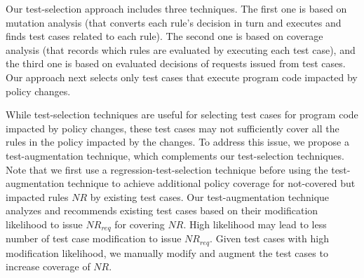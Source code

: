 
Our test-selection approach includes three techniques.
The first one is based on mutation analysis (that converts each rule's decision in turn and executes 
and finds test cases related to each rule). The second one is based on coverage analysis (that records 
which rules are evaluated by executing each test case), and the third one is based on evaluated 
decisions of requests issued from test cases. Our approach next selects only test cases that execute program code impacted by policy changes.

While test-selection techniques are useful for selecting test cases for program code impacted by policy changes, these test cases may not sufficiently cover all the rules in the policy impacted by the changes.
To address this issue, we propose a test-augmentation technique, which complements our test-selection techniques.
Note that we first use a regression-test-selection technique before using the test-augmentation technique to achieve
additional policy coverage for not-covered but impacted rules $NR$ by existing test cases.
Our test-augmentation technique analyzes and recommends existing test cases
based on their modification likelihood to issue $NR_{req}$ for covering $NR$.
High likelihood may lead to less number of test case modification to issue $NR_{req}$.
Given test cases with high modification likelihood, we manually modify and augment the test cases to increase coverage of $NR$.


